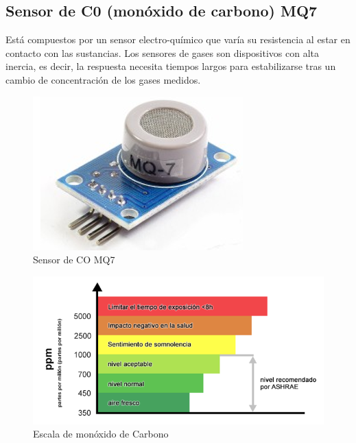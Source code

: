 \documentclass[10pt,a4paper]{article}
\begin{document}
\begin{multicols}{2}
\begin{itemize}
\subsection{Sensor de C0 (monóxido de carbono) MQ7}
Está compuestos por un sensor electro-químico que varía su resistencia al estar en contacto con las sustancias.
Los sensores de gases son dispositivos con alta inercia, es decir, la respuesta necesita tiempos largos para estabilizarse tras un cambio de concentración de los gases medidos. 


\begin{figure}[H]
\centering
\includegraphics[scale=0.7]{Capturamq.PNG}
\caption{Sensor de CO MQ7}
\end{figure}


\begin{figure}[H]
\centering
\includegraphics[scale=0.65]{escalamonoxido.PNG}
\caption{Escala de monóxido de Carbono}
\end{figure}

\end{itemize}
\end{multicols}
\end{document}
